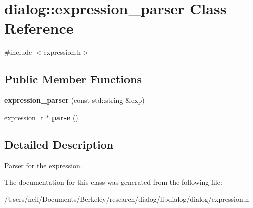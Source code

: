 \hypertarget{classdialog_1_1expression__parser}{}\section{dialog\+:\+:expression\+\_\+parser Class Reference}
\label{classdialog_1_1expression__parser}


{\ttfamily \#include $<$expression.\+h$>$}

\subsection*{Public Member Functions}
\begin{DoxyCompactItemize}
\item 
\mbox{\label{classdialog_1_1expression__parser_a93775653658b4168d4089e9f1cde83a6}} 
{\bfseries expression\+\_\+parser} (const std\+::string \&exp)
\item 
\mbox{\label{classdialog_1_1expression__parser_ac91fd93bee7e2e9b3a3e0fc232523bfc}} 
\hyperlink{structdialog_1_1expression__t}{expression\+\_\+t} $\ast$ {\bfseries parse} ()
\end{DoxyCompactItemize}


\subsection{Detailed Description}
Parser for the expression. 

The documentation for this class was generated from the following file\+:\begin{DoxyCompactItemize}
\item 
/\+Users/neil/\+Documents/\+Berkeley/research/dialog/libdialog/dialog/expression.\+h\end{DoxyCompactItemize}
